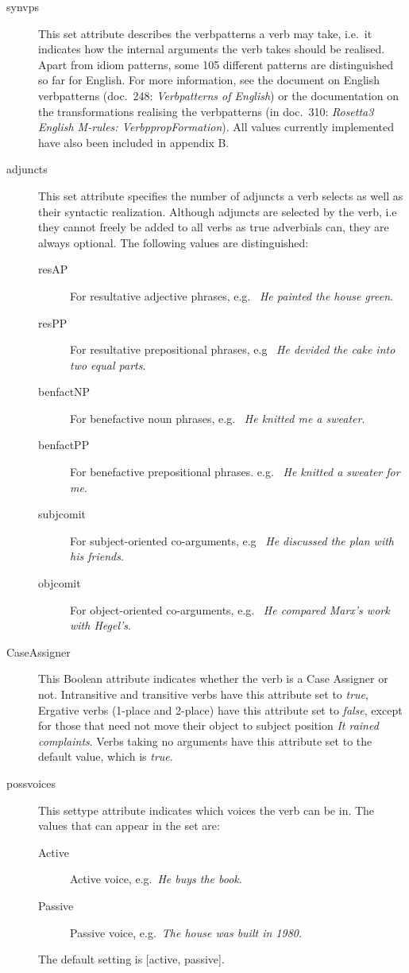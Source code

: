 \begin{description}
\item[synvps] This set attribute describes the verbpatterns a verb may take, 
i.e.\ it indicates how the internal arguments the verb takes should be realised.
Apart from idiom patterns, some 105 different patterns are distinguished so far 
for English. For more
information, see the document on English verbpatterns (doc.\ 248: 
{\em Verbpatterns of 
English\/}) or the documentation on the transformations realising the 
verbpatterns (in doc.\ 310: {\em Rosetta3 English M-rules: 
VerbppropFormation\/}). All values currently implemented have 
also been included in appendix B.

\item[adjuncts] This set attribute specifies the number of adjuncts
a verb selects as well as their syntactic realization. Although adjuncts are 
selected by the verb, i.e they cannot freely be added to all verbs as 
true adverbials can, they are always optional.
The following values are distinguished:
\begin{description}
  \item [resAP] For resultative adjective phrases, e.g. \ {\em He painted the 
house green\/}.
  \item [resPP] For resultative prepositional phrases, e.g \ {\em He devided 
the cake into two equal parts\/}.
  \item [benfactNP] For benefactive noun phrases, e.g. \ {\em He knitted me a 
sweater\/}.
  \item [benfactPP] For benefactive prepositional phrases. e.g. \ {\em He 
knitted a sweater for me\/}.
  \item [subjcomit] For subject-oriented co-arguments, e.g \ {\em He discussed 
the plan with his friends\/}.  
  \item [objcomit] For object-oriented co-arguments, e.g. \ {\em He compared 
Marx's work with Hegel's\/}.
\end{description}

\item[CaseAssigner] This Boolean attribute indicates whether the verb 
 is a Case Assigner
or not. Intransitive and transitive verbs have this attribute set to 
{\em  true\/},
Ergative verbs (1-place and 2-place) have this attribute set to {\em false\/}, 
except for those that need not move their object to subject position 
{\em It rained complaints}.
Verbs taking no arguments have this attribute set to the default value, which 
is {\em  true\/}.

\item[possvoices] This settype attribute indicates which voices the verb can
be in. The values that can appear in the set are:
  \begin{description}
  \item[Active] Active voice, e.g.\ {\em He buys the book\/}.
  \item[Passive] Passive voice, e.g.\ {\em The house was built in 1980\/}.
  \end{description}
The default setting is [active, passive].


\end{description}
